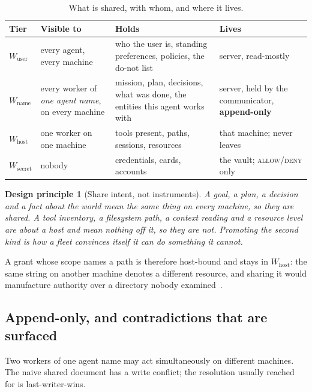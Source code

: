 \documentclass[11pt]{article}
\newtheorem{principle}{Design principle}
\begin{document}
\begin{table}[h]
\centering\small
\caption{What is shared, with whom, and where it lives.}
\label{tab:tiers}
\begin{tabular}{@{}L{2.0cm}L{3.6cm}L{5.2cm}L{3.4cm}@{}}
\toprule
\textbf{Tier} & \textbf{Visible to} & \textbf{Holds} & \textbf{Lives} \\
\midrule
$W_{\text{user}}$ & every agent, every machine & who the user is, standing preferences, policies, the do-not list & server, read-mostly \\
$W_{\text{name}}$ & every worker of \emph{one agent name}, on every machine & mission, plan, decisions, what was done, the entities this agent works with & server, held by the communicator, \textbf{append-only} \\
$W_{\text{host}}$ & one worker on one machine & tools present, paths, sessions, resources & that machine; never leaves \\
$W_{\text{secret}}$ & nobody & credentials, cards, accounts & the vault; \textsc{allow}/\textsc{deny} only \\
\bottomrule
\end{tabular}
\end{table}

\begin{principle}[Share intent, not instruments]
\label{prin:intent}
A goal, a plan, a decision and a fact about the world mean the same thing on every machine, so they are shared. A tool inventory, a filesystem path, a context reading and a resource level are \emph{about a host} and mean nothing off it, so they are not. Promoting the second kind is how a fleet convinces itself it can do something it cannot.
\end{principle}

A grant whose scope names a path is therefore host-bound and stays in $W_{\text{host}}$: the same string on another machine denotes a different resource, and sharing it would manufacture authority over a directory nobody examined~\citep{yang2026account}.

\subsection{Append-only, and contradictions that are surfaced}

Two workers of one agent name may act simultaneously on different machines. The naive shared document has a write conflict; the resolution usually reached for is last-writer-wins.
\end{document}
